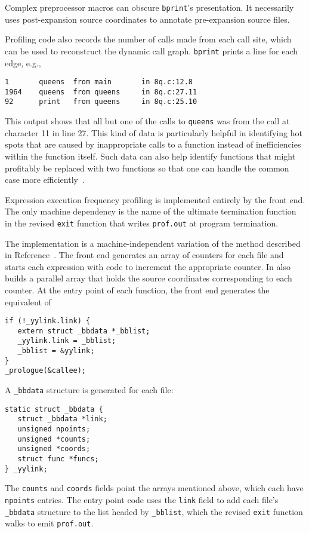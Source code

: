 Complex preprocessor macros can obscure \verb|bprint|'s presentation.
It necessarily uses post-expansion source coordinates
to annotate pre-expansion source files.

Profiling code also records the number of calls made
from each call site, which can be used to reconstruct the dynamic
call graph. \verb|bprint| prints a line for each edge, e.g.,
\begin{verbatim}
1       queens  from main       in 8q.c:12.8
1964    queens  from queens     in 8q.c:27.11
92      print   from queens     in 8q.c:25.10
\end{verbatim}
This output shows that all but one of the calls to \verb|queens| was from
the call at character 11 in line 27.
This kind of data is particularly helpful in identifying
hot spots that are caused by inappropriate calls to a function
instead of inefficiencies within the function itself.
Such data can also help identify functions that might profitably
be replaced with two functions so that one can handle
the common case more efficiently~\cite[Sec.~5.3]{bentley82}.

Expression execution frequency profiling is implemented entirely by the
front end. The only machine dependency is the name of the ultimate
termination function in the revised \verb|exit| function that writes
\verb|prof.out| at program termination.

The implementation is a machine-independent variation of the method
described in Reference~\cite{weinberger84}.  The front end generates an
array of counters for each file and starts each expression with code to
increment the appropriate counter. In also builds a parallel array that
holds the source coordinates corresponding to each counter.  At the
entry point of each function, the front end generates the equivalent of
\begin{verbatim}
if (!_yylink.link) {
   extern struct _bbdata *_bblist;
   _yylink.link = _bblist;
   _bblist = &yylink;
}
_prologue(&callee);
\end{verbatim}
A \verb|_bbdata| structure is generated for each file:
\begin{verbatim}
static struct _bbdata {
   struct _bbdata *link;
   unsigned npoints;
   unsigned *counts;
   unsigned *coords;
   struct func *funcs;
} _yylink;
\end{verbatim}
The \verb|counts| and \verb|coords| fields point the arrays mentioned above,
which each have \verb|npoints| entries.
The entry point code uses the \verb|link| field to
add each file's \verb|_bbdata| structure
to the list headed by \verb|_bblist|, which the revised \verb|exit| function walks
to emit \verb|prof.out|.

